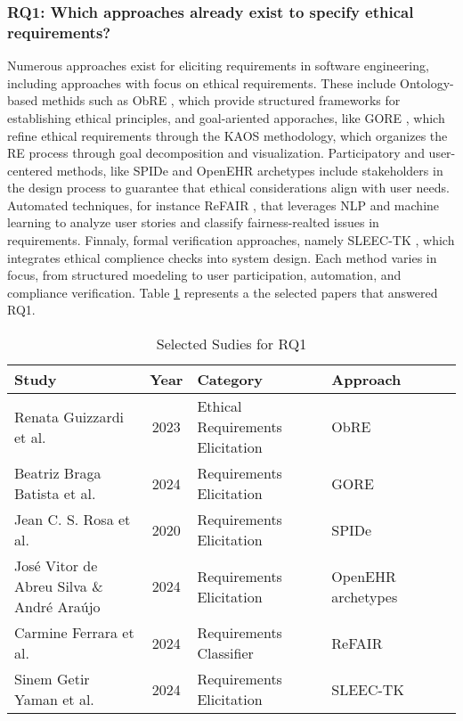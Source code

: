 \subsubsection{RQ1: Which approaches already exist to specify ethical requirements?}
Numerous approaches exist for eliciting requirements in software engineering, including approaches with focus on ethical requirements. These include Ontology-based methids such as ObRE \cite{guizzardi2023ontology}, 
which provide structured frameworks for establishing ethical principles, and goal-ariented apporaches, like GORE \cite{10.1145/3701625.3701686}, which refine ethical requirements through the KAOS methodology, which organizes the RE process through 
goal decomposition and visualization. Participatory and user-centered methods, like SPIDe \cite{10.1145/3424953.3426498} and OpenEHR archetypes \cite{silva2024use} include stakeholders in the design process to guarantee that ethical considerations align with user needs. 
Automated techniques, for instance ReFAIR \cite{10.1145/3597503.3639185}, that leverages NLP and machine learning to analyze user stories and classify fairness-realted issues in requirements. Finnaly, formal verification approaches, namely SLEEC-TK \cite{GETIRYAMAN2024103118}, which 
integrates ethical complience checks into system design. Each method varies in focus, from structured moedeling to user participation, automation, and compliance verification. Table \ref{tab:selected_papers_RQ1} represents 
a the selected papers that answered RQ1.


\begin{table}[ht]
  \centering
  \caption{Selected Sudies for RQ1}
  \label{tab:selected_papers_RQ1}
  \begin{tabular}{p{5cm} c l l l l}
  \toprule
  Study                                                         & Year     & Category                               & Approach        \\
  \midrule
  Renata Guizzardi et al.\cite{guizzardi2023ontology}           & 2023      & Ethical Requirements Elicitation    & ObRE              \\
  Beatriz Braga Batista et al.\cite{10.1145/3701625.3701686}    & 2024      & Requirements Elicitation            & GORE               \\
  Jean C. S. Rosa et al.\cite{10.1145/3424953.3426498}          & 2020      & Requirements Elicitation            & SPIDe               \\
  José Vitor de Abreu Silva \& André Araújo\cite{silva2024use}  & 2024      & Requirements Elicitation            & OpenEHR archetypes   \\
  Carmine Ferrara et al.\cite{10.1145/3597503.3639185}          & 2024      & Requirements Classifier             & ReFAIR                \\
  Sinem Getir Yaman et al.\cite{GETIRYAMAN2024103118}           & 2024      & Requirements Elicitation            & SLEEC-TK                \\
  \bottomrule
  \end{tabular}
\end{table}

